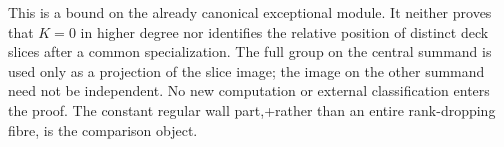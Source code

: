 \begin{remark}
\label{rem:DE-Lang-deck-slice-scope}
This is a bound on the already canonical exceptional module.
It neither proves that \(K=0\) in higher degree nor identifies
the relative position of distinct deck slices after a common
specialization. The full group on the central summand is used
only as a projection of the slice image; the image on the other
summand need not be independent. No new computation or external
classification enters the proof. The constant regular wall part,+rather than an entire rank-dropping fibre, is the comparison object.
\end{remark}
